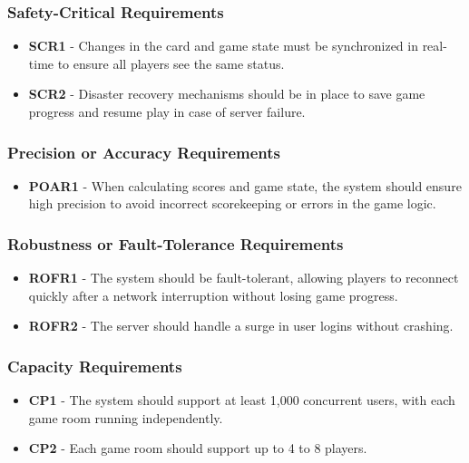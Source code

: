 \documentclass[12pt, titlepage]{article}
\begin{document}
\subsubsection{Safety-Critical Requirements}
\begin{itemize}
    \item \textbf{SCR1} - Changes in the card and game state must be synchronized in real-time to ensure all players see the same status.
    \item \textbf{SCR2} - Disaster recovery mechanisms should be in place to save game progress and resume play in case of server failure.
\end{itemize}

\subsubsection{Precision or Accuracy Requirements}
\begin{itemize}
    \item \textbf{POAR1} - When calculating scores and game state, the system should ensure high precision to avoid incorrect scorekeeping or errors in the game logic.
\end{itemize}

\subsubsection{Robustness or Fault-Tolerance Requirements}
\begin{itemize}
    \item \textbf{ROFR1} - The system should be fault-tolerant, allowing players to reconnect quickly after a network interruption without losing game progress.
    \item \textbf{ROFR2} - The server should handle a surge in user logins without crashing.
\end{itemize}

\subsubsection{Capacity Requirements}
\begin{itemize}
    \item \textbf{CP1} - The system should support at least 1,000 concurrent users, with each game room running independently.
    \item \textbf{CP2} - Each game room should support up to 4 to 8 players.
\end{itemize}
\end{document}
